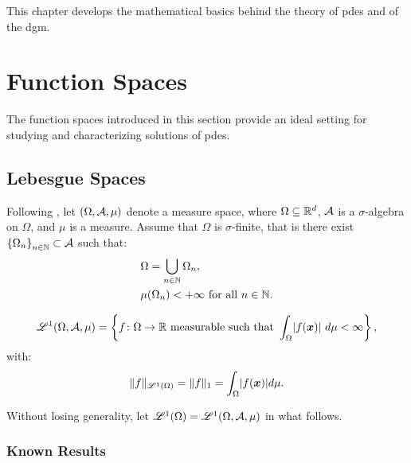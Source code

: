 This chapter develops the mathematical basics behind the theory of \acrlong{pdes} and of the \acrlong{dgm}.

\section{Function Spaces}

The function spaces introduced in this section provide an ideal setting for studying and characterizing solutions of \acrshort{pdes}.

\subsection{Lebesgue Spaces}

Following \cite[p. 89]{Brezis2010}, let $(\Omega, \mathcal{A}, \mu)$ denote a measure space, where $\Omega \subseteq \mathbb{R}^{d}$, $\mathcal{A}$ is a $\sigma$-algebra on $\Omega$, and $\mu$ is a measure. Assume that $\Omega$ is $\sigma$-finite, that is there exist $\left\{ \Omega_n \right\}_{n \in \mathbb{N}} \subset \mathcal{A}$ such that:
\begin{align}
    & \Omega = \bigcup_{n \in \mathbb{N}} \Omega_n, \\
    & \mu(\Omega_n) < +\infty \text{ for all } n \in \mathbb{N}.
\end{align}

\begin{definition}[$\Lp{1}(\Omega, \SA, \mu)$]
    \begin{gather}
        \mathscr{L}^{1}(\Omega, \mathcal{A}, \mu) = \left\{ f \colon \Omega \rightarrow \mathbb{R} \text{ measurable such that } \int_{\Omega} \lvert f(\bm{x}) \rvert ~ d \mu < \infty \right\},
    \end{gather}
    with:
    \begin{gather}
    \lVert f \rVert_{\mathscr{L}^{1}(\Omega)} = \lVert f \rVert_{1} = \int_{\Omega} \lvert f(\bm{x}) \rvert d \mu.
    \end{gather}
\end{definition}

Without losing generality, let $\mathscr{L}^{1}(\Omega) = \mathscr{L}^{1}(\Omega, \mathcal{A}, \mu)$ in what follows.

\subsubsection{Known Results}

